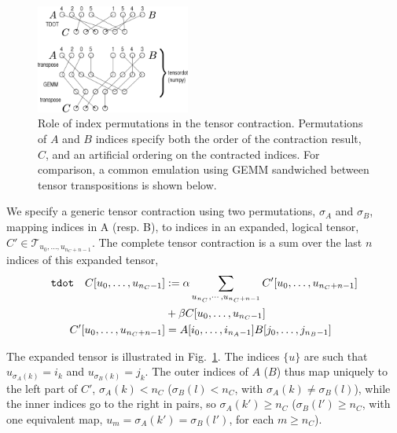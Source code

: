 \documentclass[preprint]{sigplanconf}
\begin{document}
\begin{figure}
\includegraphics[width=0.45\textwidth]{contr.eps}
\caption{Role of index permutations in the tensor contraction.
Permutations of $A$ and $B$ indices specify both the order of the
contraction result, $C$, and an artificial ordering on the contracted indices.
For comparison, a common emulation using GEMM sandwiched between tensor
transpositions is shown below.}\label{f:contr}
\end{figure}

  We specify a generic tensor contraction using two permutations,
$\sigma_A$ and $\sigma_B$, mapping indices in A (resp. B), to indices in
an expanded, logical tensor, $C' \in \mathcal T_{u_0, \ldots, u_{n_C+n-1}}$.
The complete tensor contraction is a sum over the last $n$ indices of this expanded
tensor,
\begin{align}
\text{\tt{tdot}} \quad C[u_0,\ldots,u_{n_C-1}] &:= \alpha \sum_{u_{n_C}, \cdots, u_{n_C+n-1}} C'[u_0,\ldots,u_{n_C+n-1}]  \notag \\
 & + \beta C[u_0,\ldots,u_{n_C-1}] \\
 C'[u_0,\ldots,u_{n_C+n-1}] &= A[i_0,\ldots,i_{n_A-1}] B[j_0,\ldots,j_{n_B-1}]
\end{align}

  The expanded tensor is illustrated in Fig.~\ref{f:contr}.
The indices $\{u\}$ are such that $u_{\sigma_A(k)} = i_k$ and $u_{\sigma_B(k)} = j_k$.
The outer indices of $A$ ($B$) thus map uniquely to the left part of $C'$,
$\sigma_A(k) < n_C$ ($\sigma_B(l) < n_C$, with $\sigma_A(k) \ne \sigma_B(l)$),
while the inner indices go to the right in pairs, so $\sigma_A(k') \ge n_C$ ($\sigma_B(l') \ge n_C$,
with one equivalent map, $u_{m} = \sigma_A(k') = \sigma_B(l')$, for each $m \ge n_C$).
\end{document}
